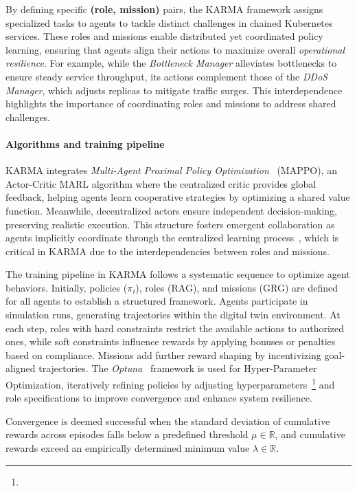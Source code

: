 By defining specific \textbf{(role, mission)} pairs, the KARMA framework assigns specialized tasks to agents to tackle distinct challenges in chained Kubernetes services. These roles and missions enable distributed yet coordinated policy learning, ensuring that agents align their actions to maximize overall \textit{operational resilience}. For example, while the \textit{Bottleneck Manager} alleviates bottlenecks to ensure steady service throughput, its actions complement those of the \textit{DDoS Manager}, which adjusts replicas to mitigate traffic surges. This interdependence highlights the importance of coordinating roles and missions to address shared challenges.

\paragraph*{Algorithms and training pipeline}

KARMA integrates \textit{Multi-Agent Proximal Policy Optimization}~\cite{Yu2022} (MAPPO), an Actor-Critic MARL algorithm where the centralized critic provides global feedback, helping agents learn cooperative strategies by optimizing a shared value function. Meanwhile, decentralized actors ensure independent decision-making, preserving realistic execution. This structure fosters emergent collaboration as agents implicitly coordinate through the centralized learning process~\cite{Yu2022}, which is critical in KARMA due to the interdependencies between roles and missions.

The training pipeline in KARMA follows a systematic sequence to optimize agent behaviors. Initially, policies (\(\pi_i\)), roles (RAG), and missions (GRG) are defined for all agents to establish a structured framework. Agents participate in simulation runs, generating trajectories within the digital twin environment. At each step, roles with hard constraints restrict the available actions to authorized ones, while soft constraints influence rewards by applying bonuses or penalties based on compliance. Missions add further reward shaping by incentivizing goal-aligned trajectories. The \textit{Optuna}~\cite{akiba2019optuna} framework is used for Hyper-Parameter Optimization, iteratively refining policies by adjusting hyperparameters~\footnote{} and role specifications to improve convergence and enhance system resilience.

Convergence is deemed successful when the standard deviation of cumulative rewards across episodes falls below a predefined threshold $\mu \in \mathbb{R}$, and cumulative rewards exceed an empirically determined minimum value $\lambda \in \mathbb{R}$.


